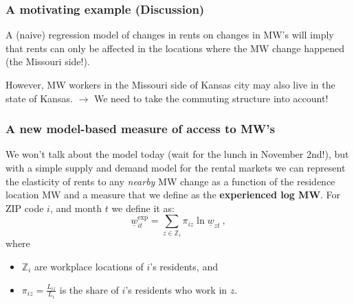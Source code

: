 \documentclass[aspectratio=169]{beamer}
\begin{document}
\begin{frame}
\frametitle{A motivating example (Discussion)}
    A (naive) regression model of changes in rents on changes in MW's will imply that rents can only be affected 
    in the locations where the MW change happened (the Missouri side!). 
    
    \pause
    \vspace{3mm}
    
    However, MW workers in the Missouri side of Kansas city may also live in the state of Kansas. $\to$ 
    We need to take the commuting structure into account! 
\end{frame}

\begin{frame}
\frametitle{A new model-based measure of access to MW's}

        We won't talk about the model today (wait for the lunch in November 2nd!), but with a simple supply and demand model for the rental markets
        we can represent the elasticity of rents to any \textit{nearby} MW change as a function of the residence location
        MW and a measure that we define as the \textbf{experienced log MW}. For ZIP code $i$, and month $t$ we define it as:
	$$
	\underline{w}^{\text{exp}}_{it} = 
	\sum_{z \in \mathbb{Z}_i} \pi_{i z} \ln \underline{w}_{zt} \ ,
	$$
	\vspace{-2.5mm}
	where
	\vspace{1mm}
	\begin{itemize} \small
		\item $\mathbb{Z}_i$ are workplace locations of $i$'s residents, and
		\item $\pi_{i z} = \frac{L_{i z}}{L_i}$ is the share of $i$'s residents who work 
		in $z$.
	\end{itemize}
\end{frame}
\end{document}
